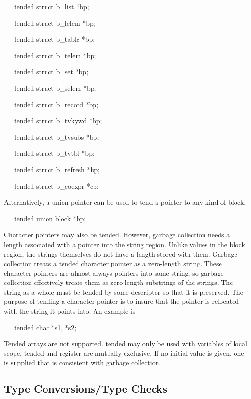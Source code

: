 {\ttfamily\mdseries
\ \ \ tended struct b\_list *bp;}

{\ttfamily\mdseries
\ \ \ tended struct b\_lelem *bp;}

{\ttfamily\mdseries
\ \ \ tended struct b\_table *bp;}

{\ttfamily\mdseries
\ \ \ tended struct b\_telem *bp;}

{\ttfamily\mdseries
\ \ \ tended struct b\_set *bp;}

{\ttfamily\mdseries
\ \ \ tended struct b\_selem *bp;}

{\ttfamily\mdseries
\ \ \ tended struct b\_record *bp;}

{\ttfamily\mdseries
\ \ \ tended struct b\_tvkywd *bp;}

{\ttfamily\mdseries
\ \ \ tended struct b\_tvsubs *bp;}

{\ttfamily\mdseries
\ \ \ tended struct b\_tvtbl *bp;}

{\ttfamily\mdseries
\ \ \ tended struct b\_refresh *bp;}

{\ttfamily\mdseries
\ \ \ tended struct b\_coexpr *cp;}


Alternatively, a union pointer can be used to tend a pointer to any
kind of block.

{\ttfamily\mdseries
\ \ \ tended union block *bp;}

Character pointers may also be tended. However, garbage collection
needs a length associated with a pointer into the string
region. Unlike values in the block region, the strings themselves do
not have a length stored with them. Garbage collection treats a tended
character pointer as a zero-length string. These character pointers
are almost always pointers into some string, so garbage collection
effectively treats them as zero-length substrings of the strings. The
string as a whole must be tended by some descriptor so that it is
preserved. The purpose of tending a character pointer is to insure
that the pointer is relocated with the string it points into. An
example is

{\ttfamily\mdseries
\ \ \ tended char *s1, *s2;}

Tended arrays are not supported. tended may only be used with
variables of local scope. tended and register are mutually
exclusive. If no initial value is given, one is supplied that is
consistent with garbage collection.

\subsection{Type Conversions/Type Checks}

